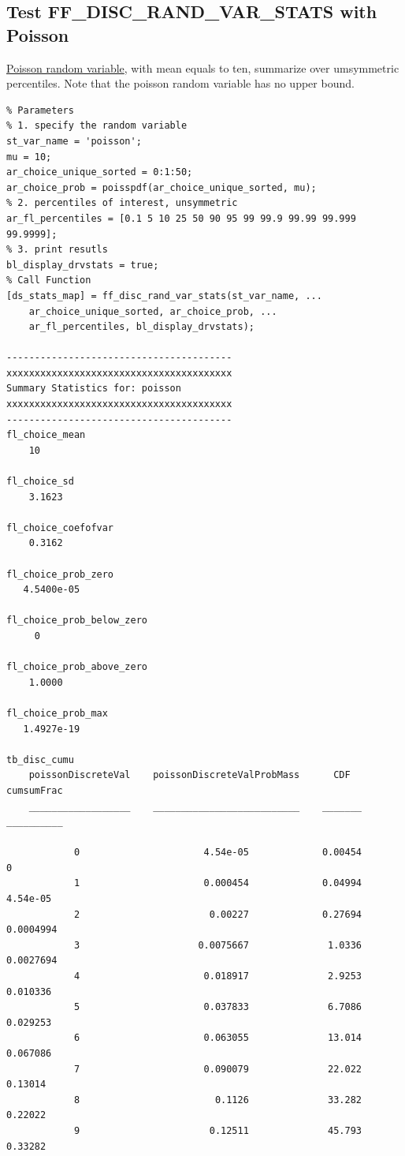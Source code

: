 \documentclass[
]{book}
\begin{document}
\hypertarget{test-ff_disc_rand_var_stats-with-poisson}{%
\subsection{Test FF\_DISC\_RAND\_VAR\_STATS with Poisson}\label{test-ff_disc_rand_var_stats-with-poisson}}

\href{https://fanwangecon.github.io/Stat4Econ/probability_discrete/htmlpdfr/poisson.html}{Poisson random
variable},
with mean equals to ten, summarize over umsymmetric percentiles. Note
that the poisson random variable has no upper bound.

\begin{verbatim}
% Parameters
% 1. specify the random variable
st_var_name = 'poisson';
mu = 10;
ar_choice_unique_sorted = 0:1:50;
ar_choice_prob = poisspdf(ar_choice_unique_sorted, mu);
% 2. percentiles of interest, unsymmetric
ar_fl_percentiles = [0.1 5 10 25 50 90 95 99 99.9 99.99 99.999 99.9999];
% 3. print resutls
bl_display_drvstats = true;
% Call Function
[ds_stats_map] = ff_disc_rand_var_stats(st_var_name, ...
    ar_choice_unique_sorted, ar_choice_prob, ...
    ar_fl_percentiles, bl_display_drvstats);

----------------------------------------
xxxxxxxxxxxxxxxxxxxxxxxxxxxxxxxxxxxxxxxx
Summary Statistics for: poisson
xxxxxxxxxxxxxxxxxxxxxxxxxxxxxxxxxxxxxxxx
----------------------------------------
fl_choice_mean
    10

fl_choice_sd
    3.1623

fl_choice_coefofvar
    0.3162

fl_choice_prob_zero
   4.5400e-05

fl_choice_prob_below_zero
     0

fl_choice_prob_above_zero
    1.0000

fl_choice_prob_max
   1.4927e-19

tb_disc_cumu
    poissonDiscreteVal    poissonDiscreteValProbMass      CDF      cumsumFrac
    __________________    __________________________    _______    __________

            0                      4.54e-05             0.00454            0 
            1                      0.000454             0.04994     4.54e-05 
            2                       0.00227             0.27694    0.0004994 
            3                     0.0075667              1.0336    0.0027694 
            4                      0.018917              2.9253     0.010336 
            5                      0.037833              6.7086     0.029253 
            6                      0.063055              13.014     0.067086 
            7                      0.090079              22.022      0.13014 
            8                        0.1126              33.282      0.22022 
            9                       0.12511              45.793      0.33282 


\end{verbatim}
\end{document}

